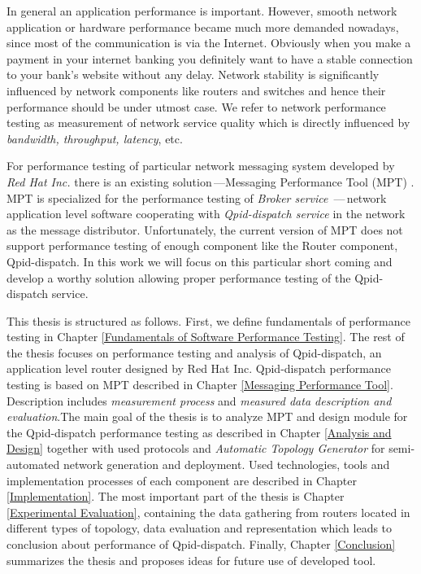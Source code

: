 In general an application performance is important. However, smooth network application or hardware performance became much more demanded nowadays, since most of the communication is via the Internet.  Obviously when you make a payment in your internet banking you definitely want to have a stable connection to your bank's website without any delay. Network stability is significantly influenced by network components like routers and switches and hence their performance should be under utmost case. We refer to network performance testing as measurement of network service quality which is directly influenced by \emph{bandwidth, throughput, latency}, etc. 

For performance testing of particular network messaging system developed by \emph{Red Hat Inc.} there is an existing solution\,---Messaging Performance Tool (MPT) \cite{ORPISKE:MSGPT}. MPT is specialized for the performance testing of \emph{Broker service} \cite{RH:Broker}\,---\,network application level software cooperating with \emph{Qpid-dispatch service} \cite{RH:Interconnect} in the network as the message distributor. Unfortunately, the current version of MPT does not support performance testing of enough component like the Router component, Qpid-dispatch. In this work we will focus on this particular short coming and develop a worthy solution allowing proper performance testing of the Qpid-dispatch service.

This thesis is structured as follows. First, we define fundamentals of performance testing in Chapter \ref{Fundamentals of Software Performance Testing}. The rest of the thesis focuses on performance testing and analysis of Qpid-dispatch, an application level router designed by Red Hat Inc. Qpid-dispatch performance testing is based on MPT described in Chapter \ref{Messaging Performance Tool}. Description includes \emph{measurement process} and \emph{measured data description and evaluation}.The main goal of the thesis is to analyze MPT and design module for the Qpid-dispatch performance testing as described in Chapter \ref{Analysis and Design} together with used protocols and \emph{Automatic Topology Generator} for semi-automated network generation and deployment. Used technologies, tools and  implementation processes of each component are described in Chapter \ref{Implementation}. The most important part of the thesis is Chapter \ref{Experimental Evaluation}, containing the data gathering  from routers located in different types of topology, data evaluation and representation which leads to conclusion about performance of Qpid-dispatch. Finally, Chapter \ref{Conclusion} summarizes the thesis and proposes ideas for future use of developed tool.


